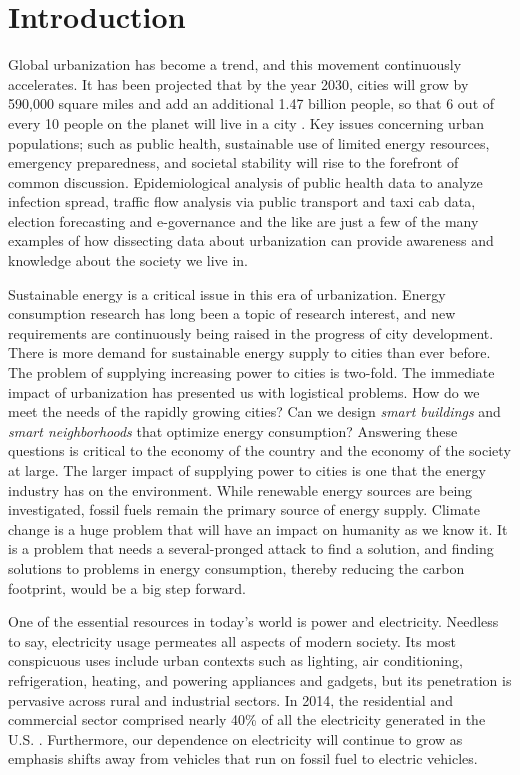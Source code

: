 \chapter{Introduction}
Global urbanization has become a trend, and this movement continuously accelerates. 
It has been projected that by the year 2030, cities will grow by 590,000 square miles and add an additional 1.47 billion people, so that 6 out of every 10 people on the planet will live in a city \cite{seto2011meta}. Key issues concerning urban populations; such as public health, sustainable use of limited energy resources, emergency preparedness, and societal stability will rise to the forefront of common discussion. Epidemiological analysis of public health data to analyze infection spread, traffic flow analysis via public transport and taxi cab data, election forecasting and e-governance and the like are just a few of the many examples of how dissecting data about urbanization can provide awareness and knowledge about the society we live in. 

Sustainable energy is a critical issue in this era of urbanization. 
Energy consumption research has long been a topic of research interest, and 
new requirements are continuously being raised in the progress of city development.  
There is more demand for sustainable energy supply to cities than ever before. The problem of supplying increasing power to cities is two-fold. The immediate impact of urbanization has presented us with logistical problems. How do we meet the needs of the rapidly growing cities? Can we design \emph{smart buildings} and \emph{smart neighborhoods} that optimize energy consumption? Answering these questions is critical to the economy of the country and the economy of the society at large. The larger impact of supplying power to cities is one that the energy industry has on the environment. While renewable energy sources are being investigated, fossil fuels remain the primary source of energy supply. 
  Climate change is a huge problem that will have an impact on humanity as we know it. 
 It is a problem that needs a several-pronged attack to find a solution, and finding solutions to problems in energy consumption, thereby reducing the carbon footprint, would be a big step forward.
 
One of the essential resources in today's world is power and electricity. Needless to say, electricity usage permeates all aspects of modern society.
Its most conspicuous
uses include urban contexts such as
lighting, air conditioning, refrigeration, heating, and powering
appliances and gadgets, but its penetration is pervasive across rural
and industrial sectors.
In 2014, the residential and commercial sector
comprised nearly 40\% of all the electricity generated in the U.S. \cite{book2014us}.
Furthermore, our dependence on electricity will continue to grow
as emphasis shifts away from vehicles that run on fossil fuel to electric
vehicles.

